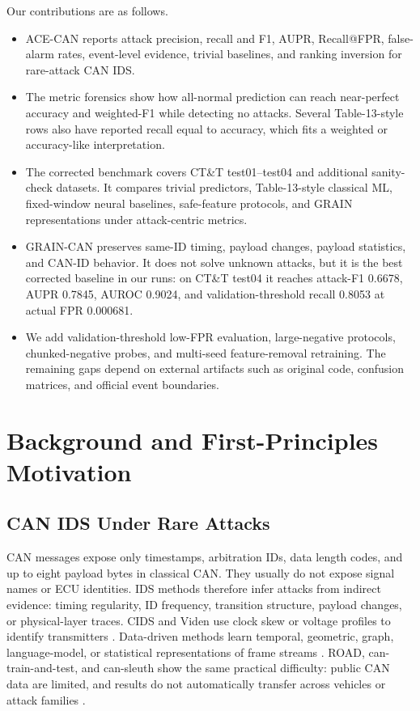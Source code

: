 \documentclass[runningheads]{llncs}%
\newcommand{\method}{GRAIN-CAN}
\newcommand{\framework}{ACE-CAN}
\begin{document}
Our contributions are as follows.
\begin{itemize}
    \item \framework{} reports attack precision, recall and F1, AUPR, Recall@FPR, false-alarm rates, event-level evidence, trivial baselines, and ranking inversion for rare-attack CAN IDS.
    \item The metric forensics show how all-normal prediction can reach near-perfect accuracy and weighted-F1 while detecting no attacks.  Several Table-13-style rows also have reported recall equal to accuracy, which fits a weighted or accuracy-like interpretation.
    \item The corrected benchmark covers CT\&T test01--test04 and additional sanity-check datasets.  It compares trivial predictors, Table-13-style classical ML, fixed-window neural baselines, safe-feature protocols, and GRAIN representations under attack-centric metrics.
    \item \method{} preserves same-ID timing, payload changes, payload statistics, and CAN-ID behavior.  It does not solve unknown attacks, but it is the best corrected baseline in our runs: on CT\&T test04 it reaches attack-F1 0.6678, AUPR 0.7845, AUROC 0.9024, and validation-threshold recall 0.8053 at actual FPR 0.000681.
    \item We add validation-threshold low-FPR evaluation, large-negative protocols, chunked-negative probes, and multi-seed feature-removal retraining.  The remaining gaps depend on external artifacts such as original code, confusion matrices, and official event boundaries.
\end{itemize}

\section{Background and First-Principles Motivation}
\subsection{CAN IDS Under Rare Attacks}
CAN messages expose only timestamps, arbitration IDs, data length codes, and up to eight payload bytes in classical CAN.  They usually do not expose signal names or ECU identities.  IDS methods therefore infer attacks from indirect evidence: timing regularity, ID frequency, transition structure, payload changes, or physical-layer traces.  CIDS and Viden use clock skew or voltage profiles to identify transmitters \cite{cho2016fingerprinting,cho2017viden}.  Data-driven methods learn temporal, geometric, graph, language-model, or statistical representations of frame streams \cite{tyree2018shape,verma2020road,alkhatib2022canbert,wang2023statgraph}.  ROAD, can-train-and-test, and can-sleuth show the same practical difficulty: public CAN data are limited, and results do not automatically transfer across vehicles or attack families \cite{verma2020road,lampe2024ctt,kidmose2025cansleuth}.
\end{document}

